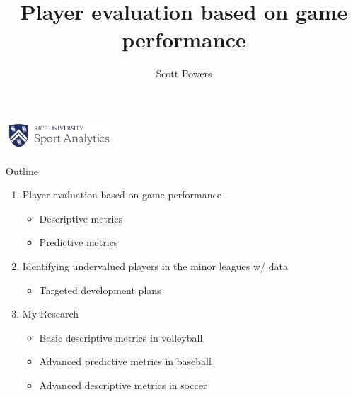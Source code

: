 \documentclass{beamer}
\title{Player evaluation based on game performance}
\author{\color{ricerichblue} Scott Powers}
\begin{document}
\begin{frame}[noframenumbering]
  \maketitle
  \vfill
  \hfill\includegraphics[width = 4cm]{images/rice_logo.png}
\end{frame}


\begin{frame}{Outline}
  \begin{enumerate}
    \item Player evaluation based on game performance
    \begin{itemize} 
      \item Descriptive metrics
      \item Predictive metrics
    \end{itemize}
    \item Identifying undervalued players in the minor leagues w/ data
    \begin{itemize}
      \item Targeted development plans
    \end{itemize}
    \item My Research
    \begin{itemize}
      \item Basic descriptive metrics in volleyball
      \item Advanced predictive metrics in baseball
      \item Advanced descriptive metrics in soccer
    \end{itemize}
  \end{enumerate}
\end{frame}
\end{document}
